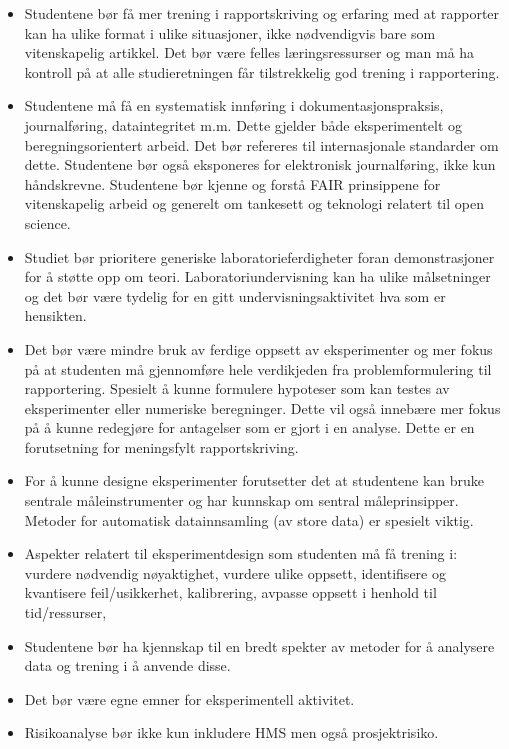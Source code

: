 \begin{itemize}
	\item Studentene bør få mer trening i rapportskriving og erfaring med at rapporter kan ha ulike format i ulike situasjoner, ikke nødvendigvis bare som vitenskapelig artikkel. Det bør være felles læringsressurser og man må ha kontroll på at alle studieretningen får tilstrekkelig god trening i rapportering. 
	\item Studentene må få en systematisk innføring i dokumentasjonspraksis, journalføring, dataintegritet m.m. Dette gjelder både eksperimentelt og beregningsorientert arbeid. Det bør refereres til internasjonale standarder om dette. Studentene bør også eksponeres for elektronisk journalføring, ikke kun håndskrevne. Studentene bør kjenne og forstå FAIR prinsippene for vitenskapelig arbeid og generelt om tankesett og teknologi relatert til open science.
	\item Studiet bør prioritere generiske laboratorieferdigheter foran demonstrasjoner for å støtte opp om teori. Laboratoriundervisning kan ha ulike målsetninger og det bør være tydelig for en gitt undervisningsaktivitet hva som er hensikten.
	\item Det bør være mindre bruk av ferdige oppsett av eksperimenter og mer fokus på at studenten må gjennomføre hele verdikjeden fra problemformulering til rapportering. Spesielt å kunne formulere hypoteser som kan testes av eksperimenter eller numeriske beregninger. Dette vil også innebære mer fokus på å kunne redegjøre for antagelser som er gjort i en analyse. Dette er en forutsetning for meningsfylt rapportskriving.
	\item For å kunne designe eksperimenter forutsetter det at studentene kan bruke sentrale måleinstrumenter og har kunnskap om sentral måleprinsipper. Metoder for automatisk datainnsamling (av store data) er spesielt viktig.
	\item Aspekter relatert til eksperimentdesign som studenten må få trening i: vurdere nødvendig nøyaktighet, vurdere ulike oppsett, identifisere og kvantisere feil/usikkerhet, kalibrering, avpasse oppsett i henhold til tid/ressurser, 
	\item Studentene bør ha kjennskap til en bredt spekter av metoder for å analysere data og trening i å anvende disse.
	\item Det bør være egne emner for eksperimentell aktivitet.
	\item Risikoanalyse bør ikke kun inkludere HMS men også prosjektrisiko.
\end{itemize}

